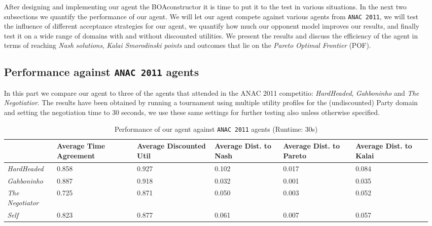 After designing and implementing our agent the BOAconstructor it is time to put it to the test in various situations. In the next two subsections we quantify the performance of our agent. 
We will let our agent compete against various agents from \texttt{ANAC 2011}, we will test the influence of different acceptance strategies for our agent,
we quantify how much our opponent model improves our results, and finally test it on a wide range of domains with and without discounted utilities.
We present the results and discuss the efficiency of the agent in terms of reaching \emph{Nash solutions}, \emph{Kalai Smorodinski points} and outcomes that lie on the \emph{Pareto Optimal Frontier} (POF).

\subsection{Performance against \texttt{ANAC 2011} agents}

In this part we compare our agent to three of the agents that attended in the ANAC 2011 competitio: \emph{HardHeaded}, \emph{Gahboninho} and \emph{The Negotiatior}. The results have been obtained by running a tournament using multiple utility profiles for the (undiscounted) Party domain and setting the negotiation time to $30$ seconds,
we use these same settings for further testing also unless otherwise specified. \\

\begin{table}
	\centering
	\small
    \begin{tabular}{l|p{2cm}|p{2cm}|p{2cm}|p{2cm}|p{2cm}|p{2cm}|}
    ~                                    & Average Time Agreement & Average Discounted Util & Average Dist. to Nash & Average Dist. to Pareto & Average Dist. to Kalai \\
    \hline
    \emph{HardHeaded}		& 0.858  & 0.927  & 0.102  & 0.017  & 0.084   \\ \hline
    \emph{Gahboninho}   	& 0.887  & 0.918  & 0.032  & 0.001  & 0.035   \\ \hline
    \emph{The Negotiator} 	& 0.725  & 0.871  & 0.050  & 0.003  & 0.052   \\ \hline
    \emph{Self}                 & 0.823  & 0.877  & 0.061  & 0.007  & 0.057   \\ \hline
    \end{tabular}
    \caption{Performance of our agent against \texttt{ANAC 2011} agents (Runtime: $30$s) \label{table:anac2011-results}}
\end{table}


